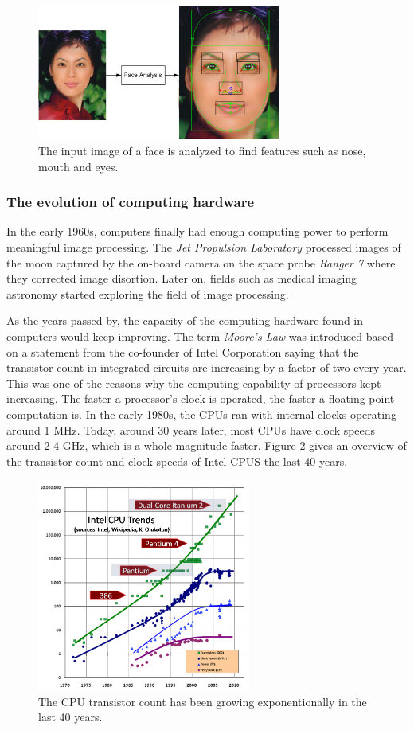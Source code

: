 \begin{figure}[ht!]
\centering
\includegraphics[width=80mm]{img/feature.jpg}
\caption{The input image of a face is analyzed to find features such as nose, mouth and eyes.}
\label{feature}
\end{figure}

\subsubsection{The evolution of computing hardware}

In the early 1960s, computers finally had enough computing power to perform meaningful image processing. The \emph{Jet Propulsion Laboratory} processed images of the moon captured by the on-board camera on the space probe \emph{Ranger 7} where they corrected image disortion. Later on, fields such as medical imaging astronomy started exploring the field of image processing. 
\newline

As the years passed by, the capacity of the computing hardware found in computers would keep improving. The term \emph{Moore's Law} was introduced based on a statement from the co-founder of Intel Corporation saying that the transistor count in integrated circuits are increasing by a factor of two every year. This was one of the reasons why the computing capability of processors kept increasing. The faster a processor's clock is operated, the faster a floating point computation is. In the early 1980s, the CPUs ran with internal clocks operating around 1 MHz. Today, around 30 years later, most CPUs have clock speeds around 2-4 GHz, which is a whole magnitude faster. Figure \ref{intelcpu} gives an overview of the transistor count and clock speeds of Intel CPUS the last 40 years.
\newline
\begin{figure}[ht!]
\centering
\includegraphics[width=70mm]{img/CPU.png}
\caption{The CPU transistor count has been growing exponentionally in the last 40 years.}
\label{intelcpu}
\end{figure}


